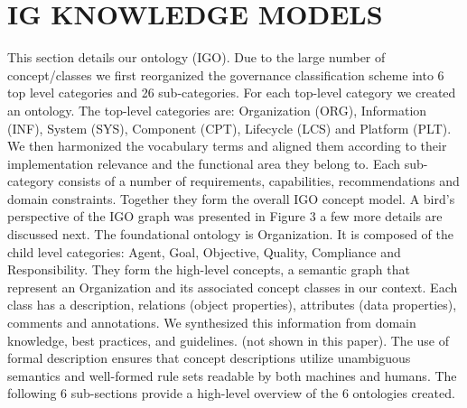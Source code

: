 \section{\uppercase{IG Knowledge Models}}
This section details our ontology (IGO). Due to the large number of concept/classes we first reorganized the governance classification scheme into 6 top level categories and 26 sub-categories. For each top-level category we created an ontology. 
The top-level categories are: Organization (ORG), Information (INF), System (SYS), Component (CPT), Lifecycle (LCS) and Platform (PLT). We then harmonized the vocabulary terms and aligned them according to their implementation relevance and the functional area they belong to. Each sub-category consists of a number of requirements, capabilities, recommendations and domain constraints. Together they form the overall IGO concept model. A bird’s perspective of the IGO graph was presented in Figure 3 a few more details are discussed next. 
The foundational ontology is Organization. It is composed of the child level categories: Agent, Goal, Objective, Quality, Compliance and Responsibility. They form the high-level concepts, a semantic graph that represent an Organization and its associated concept classes in our context.  Each class has a description, relations (object properties), attributes (data properties), comments and annotations. We synthesized this information from domain knowledge, best practices, and guidelines. (not shown in this paper). The use of formal description ensures that concept descriptions utilize unambiguous semantics and well-formed rule sets readable by both machines and humans. The following 6 sub-sections provide a high-level overview of the 6 ontologies created.
